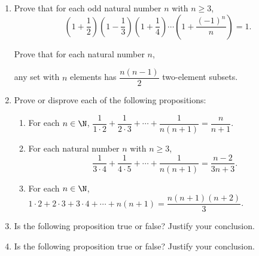 \begin{enumerate}
\item Prove that for each odd natural number $n$ with $n \geq 3$,
\[
\left( {1 + \frac{1}{2}} \right)
\left( {1 - \frac{1}{3}} \right)
\left( {1 + \frac{1}{4}} \right) 
\cdots 
\left( {1 + \frac{{\left( { - 1} \right)^n }}{n}} \right) = 1.
\]

\xitem Prove that for each natural number $n$, \label{exer:2elementsubsets}
\begin{center}
any set with $n$ elements has 
$\dfrac{n \left( {n-1} \right)}{2}$ two-element subsets.
\end{center}



\item Prove or disprove each of the following propositions:
\begin{enumerate}
\item For each $n \in \N$, $\dfrac{1}{1 \cdot 2} + \dfrac{1}{2 \cdot 3} + \cdots + \dfrac{1}{n (n + 1 )} = \dfrac{n}{n+1}$.

\item For each natural number $n$ with $n \geq 3$, 
\[
\frac{1}{3 \cdot 4} + \frac{1}{4 \cdot 5} + \cdots + \frac{1}{n (n + 1 )} = \frac{n-2}{3n + 3}.
\]

\item For each $n \in \N$, $1 \cdot 2 + 2 \cdot 3 + 3 \cdot 4 + \cdots + n (n + 1 ) = \dfrac{n (n + 1 ) (n + 2 )}{3}$.
\end{enumerate}



\item Is the following proposition true or false?  Justify your conclusion.


\item Is the following proposition true or false?  Justify your conclusion.





\end{enumerate}
